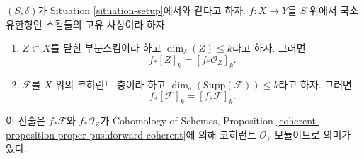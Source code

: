 \begin{lemma}
\label{lemma-cycle-push-sheaf}
$(S, \delta)$가 Situation \ref{situation-setup}에서와 같다고 하자.
$f : X \to Y$를 $S$ 위에서 국소 유한형인 스킴들의 고유 사상이라 하자.
\begin{enumerate}
\item $Z \subset X$를 닫힌 부분스킴이라 하고
$\dim_\delta(Z) \leq k$라고 하자. 그러면
$$
f_*[Z]_k = [f_*{\mathcal O}_Z]_k.
$$
\item $\mathcal{F}$를 $X$ 위의 코히런트 층이라 하고
$\dim_\delta(\text{Supp}(\mathcal{F})) \leq k$라고 하자. 그러면
$$
f_*[\mathcal{F}]_k = [f_*{\mathcal F}]_k.
$$
\end{enumerate}
이 진술은 $f_*\mathcal{F}$와 $f_*\mathcal{O}_Z$가
Cohomology of Schemes, Proposition
\ref{coherent-proposition-proper-pushforward-coherent}에 의해
코히런트 $\mathcal{O}_Y$-모듈이므로 의미가 있다.
\end{lemma}

